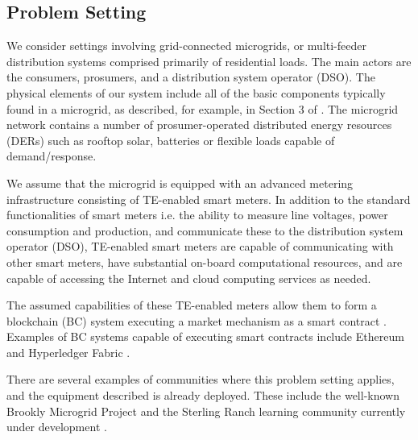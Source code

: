 \documentclass[sigplan]{acmart}
\begin{document}
\subsection{Problem Setting}

We consider settings involving grid-connected microgrids, or multi-feeder distribution systems comprised primarily of residential loads. The main actors are the consumers, prosumers, and a distribution system operator (DSO). The physical elements of our system include all of the basic components typically found in a microgrid, as described, for example, in Section 3 of \cite{LBNLReport}. The microgrid network contains a number of prosumer-operated distributed energy resources (DERs) such as rooftop solar, batteries or flexible loads capable of demand/response.



We assume that the microgrid is equipped with an advanced metering infrastructure consisting of TE-enabled smart meters. In addition to the standard functionalities of smart meters i.e. the ability to measure line voltages, power consumption and production, and communicate these to the distribution system operator (DSO), TE-enabled smart meters are capable of communicating with other smart meters, have substantial on-board computational resources, and are capable of accessing the Internet and cloud computing services as needed. 







The assumed capabilities of these TE-enabled meters allow them to form a blockchain (BC) system executing a market mechanism as a smart contract \cite{Szabo97}. Examples of BC systems capable of executing smart contracts include Ethereum \cite{Buterin2013} and Hyperledger Fabric \cite{HyperledgerFabric16}.


There are several examples of communities where this problem setting applies, and the equipment described is already deployed. These include the well-known Brookly Microgrid Project \cite{BrooklynMicrogrid} and the Sterling Ranch learning community currently under development \cite{SterlingRanch}. 
\end{document}
